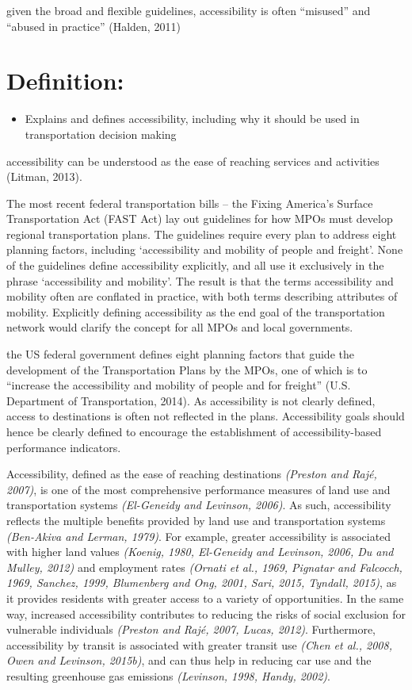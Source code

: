 \documentclass[12pt,]{article}
\providecommand{\tightlist}{%
  \setlength{\itemsep}{0pt}\setlength{\parskip}{0pt}}
\begin{document}
given the broad and flexible guidelines, accessibility is often
``misused'' and ``abused in practice'' (Halden, 2011)

\hypertarget{definition}{%
\section{Definition:}\label{definition}}

\begin{itemize}
\tightlist
\item
  Explains and defines accessibility, including why it should be used in
  transportation decision making
\end{itemize}

accessibility can be understood as the ease of reaching services and
activities (Litman, 2013).

The most recent federal transportation bills -- the Fixing America's
Surface Transportation Act (FAST Act) lay out guidelines for how MPOs
must develop regional transportation plans. The guidelines require every
plan to address eight planning factors, including `accessibility and
mobility of people and freight'. None of the guidelines define
accessibility explicitly, and all use it exclusively in the phrase
`accessibility and mobility'. The result is that the terms accessibility
and mobility often are conflated in practice, with both terms describing
attributes of mobility. Explicitly defining accessibility as the end
goal of the transportation network would clarify the concept for all
MPOs and local governments.

the US federal government defines eight planning factors that guide the
development of the Transportation Plans by the MPOs, one of which is to
``increase the accessibility and mobility of people and for freight''
(U.S. Department of Transportation, 2014). As accessibility is not
clearly defined, access to destinations is often not reflected in the
plans. Accessibility goals should hence be clearly defined to encourage
the establishment of accessibility-based performance indicators.

Accessibility, defined as the ease of reaching destinations
\emph{(Preston and Rajé, 2007)}, is one of the most comprehensive
performance measures of land use and transportation systems
\emph{(El-Geneidy and Levinson, 2006)}. As such, accessibility reflects
the multiple benefits provided by land use and transportation systems
\emph{(Ben-Akiva and Lerman, 1979)}. For example, greater accessibility
is associated with higher land values \emph{(Koenig, 1980, El-Geneidy
and Levinson, 2006, Du and Mulley, 2012)} and employment rates
\emph{(Ornati et al., 1969, Pignatar and Falcocch, 1969, Sanchez, 1999,
Blumenberg and Ong, 2001, Sari, 2015, Tyndall, 2015)}, as it provides
residents with greater access to a variety of opportunities. In the same
way, increased accessibility contributes to reducing the risks of social
exclusion for vulnerable individuals \emph{(Preston and Rajé, 2007,
Lucas, 2012)}. Furthermore, accessibility by transit is associated with
greater transit use \emph{(Chen et al., 2008, Owen and Levinson,
2015b)}, and can thus help in reducing car use and the resulting
greenhouse gas emissions \emph{(Levinson, 1998, Handy, 2002)}.
\end{document}
